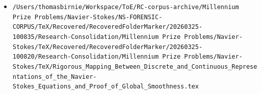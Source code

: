 \begin{itemize}
\item \texttt{/Users/thomasbirnie/Workspace/ToE/RC-corpus-archive/Millennium Prize Problems/Navier-Stokes/NS-FORENSIC-CORPUS/TeX/Recovered/RecoveredFolderMarker/20260325-100835/Research-Consolidation/Millennium Prize Problems/Navier-Stokes/TeX/Recovered/RecoveredFolderMarker/20260325-100820/Research-Consolidation/Millennium Prize Problems/Navier-Stokes/TeX/Rigorous\_Mapping\_Between\_Discrete\_and\_Continuous\_Representations\_of\_the\_Navier-Stokes\_Equations\_and\_Proof\_of\_Global\_Smoothness.tex}
\end{itemize}
